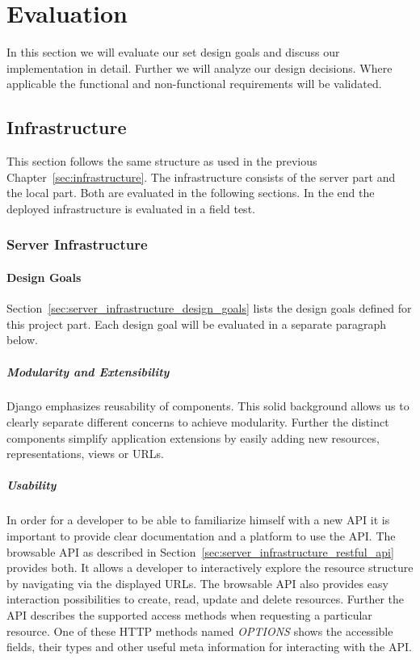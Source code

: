 
\chapter{Evaluation}
\label{sec:evaluation}

In this section we will evaluate our set design goals and discuss our implementation in detail.
Further we will analyze our design decisions.
Where applicable the functional and non-functional requirements will be validated.

\section{Infrastructure}

This section follows the same structure as used in the previous Chapter~\ref{sec:infrastructure}.
The infrastructure consists of the server part and the local part.
Both are evaluated in the following sections.
In the end the deployed infrastructure is evaluated in a field test.

\subsection{Server Infrastructure}

\subsubsection{Design Goals}

Section~\ref{sec:server_infrastructure_design_goals} lists the design goals defined for this project part.
Each design goal will be evaluated in a separate paragraph below.

\paragraph{Modularity and Extensibility} Django emphasizes reusability of components.
This solid background allows us to clearly separate different concerns to achieve modularity.
Further the distinct components simplify application extensions by easily adding new resources, representations, views or URLs.

\paragraph{Usability} In order for a developer to be able to familiarize himself with a new API it is important to provide clear documentation and a platform to use the API.
The browsable API as described in Section~\ref{sec:server_infrastructure_restful_api} provides both.
It allows a developer to interactively explore the resource structure by navigating via the displayed URLs.
The browsable API also provides easy interaction possibilities to create, read, update and delete resources.
Further the API describes the supported access methods when requesting a particular resource.
One of these HTTP methods named \emph{OPTIONS} shows the accessible fields, their types and other useful meta information for interacting with the API.


